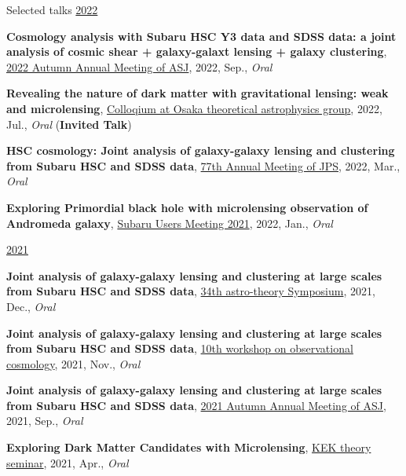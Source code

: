 \begin{rSection}{Selected talks}
\underline{2022}
\begin{etaremune}
\setcounter{enumi}{24}
\item \textbf{Cosmology analysis with Subaru HSC Y3 data and SDSS data: a joint analysis of cosmic shear + galaxy-galaxt lensing + galaxy clustering}, \href{https://www.asj.or.jp/nenkai/archive/2022b/pdf/U15a.pdf}{2022 Autumn Annual Meeting of ASJ}, 2022, Sep., \textit{Oral}
\item \textbf{Revealing the nature of dark matter with gravitational lensing: weak and microlensing}, \href{http://astro-osaka.jp/OUTAP/colloquium-abstracts.html#sugiyama}{Colloqium at Osaka theoretical astrophysics group}, 2022, Jul., \textit{Oral} (\textbf{Invited Talk})
\item \textbf{HSC cosmology: Joint analysis of galaxy-galaxy lensing and clustering from Subaru HSC and SDSS data}, \href{https://www.jps.or.jp/activities/meetings/annual/annual-index.php}{77th Annual Meeting of JPS}, 2022, Mar., \textit{Oral}
\item \textbf{Exploring Primordial black hole with microlensing observation of Andromeda galaxy}, \href{https://subarutelescope.org/Science/SubaruUM/SubaruUM2021/}{Subaru Users Meeting 2021}, 2022, Jan., \textit{Oral}
\end{etaremune}

\underline{2021}
\begin{etaremune}
\setcounter{enumi}{20}
\item \textbf{Joint analysis of galaxy-galaxy lensing and clustering at large scales from Subaru HSC and SDSS data}, \href{https://sites.google.com/view/rironkon2021/}{34th astro-theory Symposium}, 2021, Dec., \textit{Oral}
\item \textbf{Joint analysis of galaxy-galaxy lensing and clustering at large scales from Subaru HSC and SDSS data}, \href{https://sites.google.com/view/obscosmws2021main}{10th workshop on observational cosmology}, 2021, Nov., \textit{Oral}
\item \textbf{Joint analysis of galaxy-galaxy lensing and clustering at large scales from Subaru HSC and SDSS data}, \href{https://www.asj.or.jp/nenkai/archive/2021b/pdf/U05a.pdf}{2021 Autumn Annual Meeting of ASJ}, 2021, Sep., \textit{Oral}
\item \textbf{Exploring Dark Matter Candidates with Microlensing}, \href{https://www.kek.jp/ja/conference/20210407-3/}{KEK theory seminar}, 2021, Apr., \textit{Oral}
\end{etaremune}


\end{rSection}
